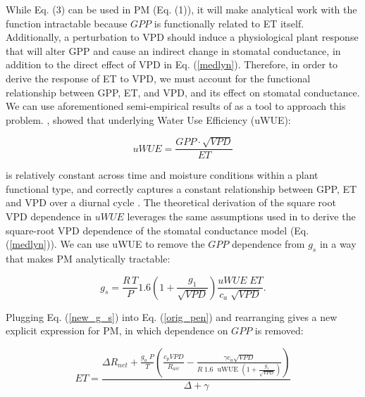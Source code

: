 While Eq. (3) can be used in PM (Eq. (1)), it will make
analytical work with the function intractable because $GPP$ is
functionally related to ET itself. Additionally, a perturbation to VPD
should induce a physiological plant response that will alter GPP and
cause an indirect change in stomatal conductance, in addition to the
direct effect of VPD in Eq. (\ref{medlyn}). Therefore, in order to
derive the response of ET to VPD, we must account for the functional
relationship between GPP, ET, and VPD, and its effect on stomatal
conductance. We can use aforementioned semi-empirical results of
\citet{Zhou_2015} as a tool to approach this
problem. \citet{Zhou_2015}, showed that  underlying Water Use
Efficiency (uWUE):

  \begin{equation}
    uWUE = \frac{GPP \cdot \sqrt{VPD}}{ET}
    \label{uwue}
  \end{equation}

is relatively constant across time and moisture conditions within a
plant functional type, and correctly captures a constant relationship
between GPP, ET and VPD over a diurnal cycle \citep{Zhou_2014}. The
theoretical derivation of the square root VPD dependence in $uWUE$
leverages the same assumptions used in \cite{MEDLYN_2011} to derive the
square-root VPD dependence of the stomatal conductance model (Eq.
(\ref{medlyn})).  We can use uWUE to remove the $GPP$ dependence from
$g_s$ in a way that makes PM analytically tractable:

  \begin{equation}
    g_s = \frac{R \, T}{P} 1.6 \left(1 + \frac{g_1}{\sqrt{VPD}}\right) \frac{uWUE \; ET}{c_a \; \sqrt{VPD}}.
    \label{new_g_s}
  \end{equation}

Plugging Eq. (\ref{new_g_s}) into Eq. (\ref{orig_pen}) and
rearranging gives a new explicit expression for PM, in which
dependence on $GPP$ is removed:

  \begin{equation}
    ET = \frac{\Delta R_{net} + \frac{g_a\; P}{T} \left( \frac{ c_p VPD}{R_{air}} -  \frac{\gamma c_a \sqrt{VPD} }{ R \; 1.6\; \text{ uWUE } (1 + \frac{g_1}{\sqrt{VPD}})} \right) }{ \Delta + \gamma}
    \label{et}
  \end{equation}

